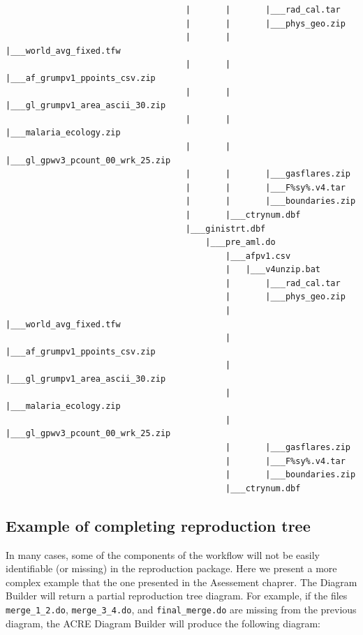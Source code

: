 \documentclass[
]{book}
\begin{document}
\begin{verbatim}
                                    |       |       |___rad_cal.tar
                                    |       |       |___phys_geo.zip
                                    |       |       |___world_avg_fixed.tfw
                                    |       |       |___af_grumpv1_ppoints_csv.zip
                                    |       |       |___gl_grumpv1_area_ascii_30.zip
                                    |       |       |___malaria_ecology.zip
                                    |       |       |___gl_gpwv3_pcount_00_wrk_25.zip
                                    |       |       |___gasflares.zip
                                    |       |       |___F%sy%.v4.tar
                                    |       |       |___boundaries.zip
                                    |       |___ctrynum.dbf
                                    |___ginistrt.dbf
                                        |___pre_aml.do
                                            |___afpv1.csv
                                            |   |___v4unzip.bat
                                            |       |___rad_cal.tar
                                            |       |___phys_geo.zip
                                            |       |___world_avg_fixed.tfw
                                            |       |___af_grumpv1_ppoints_csv.zip
                                            |       |___gl_grumpv1_area_ascii_30.zip
                                            |       |___malaria_ecology.zip
                                            |       |___gl_gpwv3_pcount_00_wrk_25.zip
                                            |       |___gasflares.zip
                                            |       |___F%sy%.v4.tar
                                            |       |___boundaries.zip
                                            |___ctrynum.dbf
\end{verbatim}

\hypertarget{example-of-completing-reproduction-tree}{%
\subsection{Example of completing reproduction tree}\label{example-of-completing-reproduction-tree}}

In many cases, some of the components of the workflow will not be easily identifiable (or missing) in the reproduction package. Here we present a more complex example that the one presented in the Asessement chaprer. The Diagram Builder will return a partial reproduction tree diagram. For example, if the files \texttt{merge\_1\_2.do}, \texttt{merge\_3\_4.do}, and \texttt{final\_merge.do} are missing from the previous diagram, the ACRE Diagram Builder will produce the following diagram:
\end{document}
